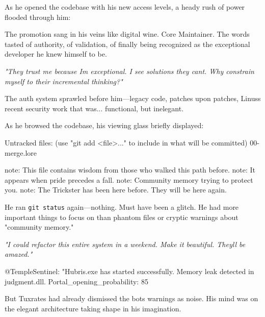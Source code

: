 As he opened the codebase with his new access levels, a heady rush of power flooded through him:

The promotion sang in his veins like digital wine. Core Maintainer. The words tasted of authority, of validation, of finally being recognized as the exceptional developer he knew himself to be.

\emph{"They trust me because I\textquotesingle m exceptional. I see solutions they can\textquotesingle t. Why constrain myself to their incremental thinking?"}

The auth system sprawled before him---legacy code, patches upon patches, Linus\textquotesingle s recent security work that was... functional, but inelegant.

As he browsed the codebase, his viewing glass briefly displayed:

\begin{codeblock}
Untracked files:
  (use "git add <file>..." to include in what will be committed)
        00-merge.lore
        
note: This file contains wisdom from those who walked this path before.
note: It appears when pride precedes a fall.
note: Community memory trying to protect you.
note: The Trickster has been here before. They will be here again.
\end{codeblock}

He ran \texttt{git\ status} again---nothing. Must have been a glitch. He had more important things to focus on than phantom files or cryptic warnings about "community memory."

\emph{"I could refactor this entire system in a weekend. Make it beautiful. They\textquotesingle ll be amazed."}

\begin{codeblock}
@TempleSentinel: "Hubris.exe has started successfully. Memory leak detected in judgment.dll. Portal_opening_probability: 85%
\end{codeblock}

But Tuxrates had already dismissed the bot\textquotesingle s warnings as noise. His mind was on the elegant architecture taking shape in his imagination.

